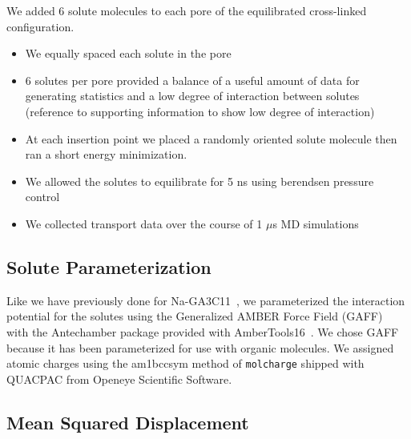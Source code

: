 \documentclass{article}
\begin{document}
  \noindent We added 6 solute molecules to each pore of the equilibrated cross-linked
  configuration.
  \begin{itemize}
	\item We equally spaced each solute in the pore
	\item 6 solutes per pore provided a balance of a useful amount of data
	for generating statistics and a low degree of interaction between solutes (reference
	to supporting information to show low degree of interaction)
	\item At each insertion point we placed a randomly oriented solute molecule
	then ran a short energy minimization.
	\item We allowed the solutes to equilibrate for 5 ns using berendsen 
	pressure control
	\item We collected transport data over the course of 1 $\mu$s MD simulations
  \end{itemize}
  
  \subsection*{Solute Parameterization}
  
  Like we have previously done for Na-GA3C11~\cite{coscia_understanding_2019}, we
  parameterized the interaction potential for the solutes using the Generalized 
  AMBER Force Field (GAFF)~\cite{wang_development_2004} with the Antechamber package
  \cite{wang_automatic_2006} provided with AmberTools16~\cite{case_ambertools16_2016}.
  We chose GAFF because it has been parameterized for use with organic molecules. We
  assigned atomic charges using the am1bccsym method of \texttt{molcharge} shipped
  with QUACPAC from Openeye Scientific Software.
  
  \subsection*{Mean Squared Displacement}\label{method:MSD}
\end{document}
